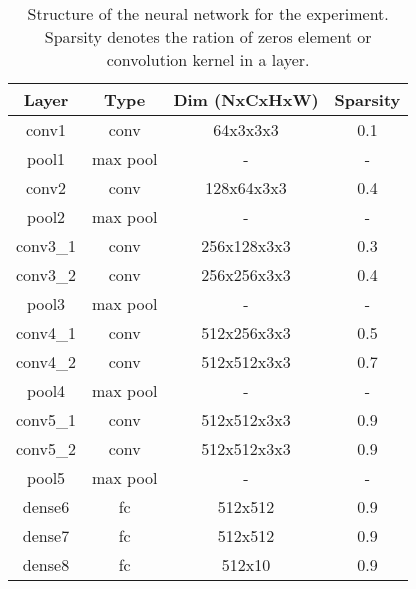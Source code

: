 \begin{table}[tb]
    \centering
    \caption{Structure of the neural network for the experiment. Sparsity denotes the ration of zeros element or convolution kernel in a layer.}
    \label{table:sparsity}
    \begin{tabular}{cccc}
    \hline
    Layer    & Type     & Dim (NxCxHxW) & Sparsity \\ \hline
    conv1    & conv     & 64x3x3x3      & 0.1      \\
    pool1    & max pool & -             & -        \\ 
    conv2    & conv     & 128x64x3x3    & 0.4      \\ 
    pool2    & max pool & -             & -        \\ 
    conv3\_1 & conv     & 256x128x3x3   & 0.3      \\ 
    conv3\_2 & conv     & 256x256x3x3   & 0.4      \\ 
    pool3    & max pool & -             & -        \\ 
    conv4\_1 & conv     & 512x256x3x3   & 0.5      \\ 
    conv4\_2 & conv     & 512x512x3x3   & 0.7      \\ 
    pool4    & max pool & -             & -        \\ 
    conv5\_1 & conv     & 512x512x3x3   & 0.9      \\ 
    conv5\_2 & conv     & 512x512x3x3   & 0.9      \\ 
    pool5    & max pool & -             & -        \\ 
    dense6   & fc       & 512x512       & 0.9      \\ 
    dense7   & fc       & 512x512       & 0.9      \\ 
    dense8   & fc       & 512x10        & 0.9      \\ 
    \hline
    \end{tabular}
\end{table}